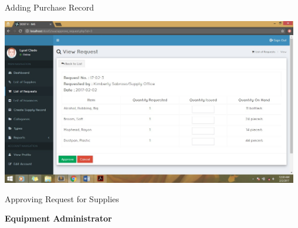 \begin{center}
\begin{center}
	Adding Purchase Record\\
	\vspace{1.5cm}
	\includegraphics[width=13cm,height=8cm]{image/d3-9.jpg}\\
	Approving Request for Supplies\\
\end{center}


\begin{flushleft}
	\textbf{Equipment Administrator}
\end{flushleft}	


\end{center}

